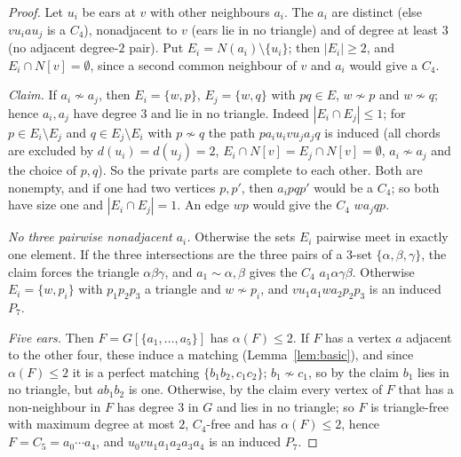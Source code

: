 \documentclass[11pt]{amsart}
\theoremstyle{definition}
\theoremstyle{remark}
\begin{document}
\begin{proof}
Let $u_i$ be ears at $v$ with other neighbours $a_i$. The $a_i$ are distinct (else $v u_i a u_j$ is a $C_4$), nonadjacent to $v$ (ears lie in no triangle) and of degree at least $3$ (no adjacent degree-$2$ pair). Put $E_i=N(a_i)\setminus\{u_i\}$; then $|E_i|\ge2$, and $E_i\cap N[v]=\emptyset$, since a second common neighbour of $v$ and $a_i$ would give a $C_4$.

\emph{Claim.} If $a_i\not\sim a_j$, then $E_i=\{w,p\}$, $E_j=\{w,q\}$ with $pq\in E$, $w\not\sim p$ and $w\not\sim q$; hence $a_i,a_j$ have degree $3$ and lie in no triangle. Indeed $|E_i\cap E_j|\le1$; for $p\in E_i\setminus E_j$ and $q\in E_j\setminus E_i$ with $p\not\sim q$ the path $p a_i u_i v u_j a_j q$ is induced (all chords are excluded by $d(u_i)=d(u_j)=2$, $E_i\cap N[v]=E_j\cap N[v]=\emptyset$, $a_i\not\sim a_j$ and the choice of $p,q$). So the private parts are complete to each other. Both are nonempty, and if one had two vertices $p,p'$, then $a_i p q p'$ would be a $C_4$; so both have size one and $|E_i\cap E_j|=1$. An edge $wp$ would give the $C_4$ $w a_j q p$.

\emph{No three pairwise nonadjacent $a_i$.} Otherwise the sets $E_i$ pairwise meet in exactly one element. If the three intersections are the three pairs of a $3$-set $\{\alpha,\beta,\gamma\}$, the claim forces the triangle $\alpha\beta\gamma$, and $a_1\sim\alpha,\beta$ gives the $C_4$ $a_1\alpha\gamma\beta$. Otherwise $E_i=\{w,p_i\}$ with $p_1p_2p_3$ a triangle and $w\not\sim p_i$, and $v u_1 a_1 w a_2 p_2 p_3$ is an induced $P_7$.

\emph{Five ears.} Then $F=G[\{a_1,\dots,a_5\}]$ has $\alpha(F)\le2$. If $F$ has a vertex $a$ adjacent to the other four, these induce a matching (Lemma~\ref{lem:basic}), and since $\alpha(F)\le2$ it is a perfect matching $\{b_1b_2,c_1c_2\}$; $b_1\not\sim c_1$, so by the claim $b_1$ lies in no triangle, but $ab_1b_2$ is one. Otherwise, by the claim every vertex of $F$ that has a non-neighbour in $F$ has degree $3$ in $G$ and lies in no triangle; so $F$ is triangle-free with maximum degree at most $2$, $C_4$-free and has $\alpha(F)\le2$, hence $F=C_5=a_0\cdots a_4$, and $u_0 v u_1 a_1 a_2 a_3 a_4$ is an induced $P_7$.
\end{proof}
\end{document}
